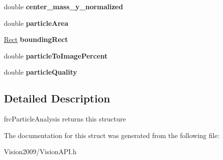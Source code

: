 \begin{DoxyCompactItemize}
\item 
\hypertarget{structParticleAnalysisReport__struct_a43879c286628a00bb8f72abbba308ffe}{
double {\bfseries center\_\-mass\_\-y\_\-normalized}}
\label{structParticleAnalysisReport__struct_a43879c286628a00bb8f72abbba308ffe}

\item 
\hypertarget{structParticleAnalysisReport__struct_ae36ed09b78a6a822a00d7d73aaea4296}{
double {\bfseries particleArea}}
\label{structParticleAnalysisReport__struct_ae36ed09b78a6a822a00d7d73aaea4296}

\item 
\hypertarget{structParticleAnalysisReport__struct_a6deb18fa04d329484f7761acd4b81088}{
\hyperlink{structRect__struct}{Rect} {\bfseries boundingRect}}
\label{structParticleAnalysisReport__struct_a6deb18fa04d329484f7761acd4b81088}

\item 
\hypertarget{structParticleAnalysisReport__struct_a9daf2b0e5b0decab579fa14fda400128}{
double {\bfseries particleToImagePercent}}
\label{structParticleAnalysisReport__struct_a9daf2b0e5b0decab579fa14fda400128}

\item 
\hypertarget{structParticleAnalysisReport__struct_aec641d7b7ad13c0a9a8186c052e5c442}{
double {\bfseries particleQuality}}
\label{structParticleAnalysisReport__struct_aec641d7b7ad13c0a9a8186c052e5c442}

\end{DoxyCompactItemize}


\subsection{Detailed Description}
frcParticleAnalysis returns this structure 

The documentation for this struct was generated from the following file:\begin{DoxyCompactItemize}
\item 
Vision2009/VisionAPI.h\end{DoxyCompactItemize}
